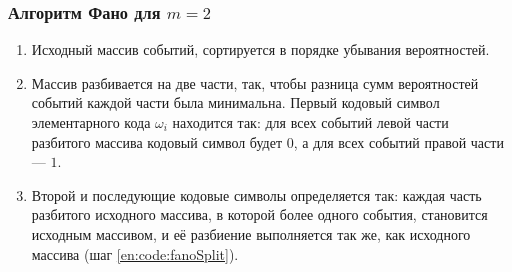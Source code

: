 \begin{frame}
    \frametitle{Алгоритм Фано для $m=2$}
    
    \begin{enumerate}
        \item Исходный массив событий, сортируется в порядке убывания вероятностей. 
    
        \item \label{en:code:fanoSplit} Массив разбивается на две части, так, чтобы разница сумм вероятностей событий каждой части была минимальна. Первый кодовый символ элементарного кода $\omega_i$ находится так: для всех событий левой части разбитого массива кодовый символ будет $0$, а для всех событий правой части --- $1$. 
    
        \item Второй и последующие кодовые символы определяется так: каждая часть разбитого исходного массива, в которой более одного события, становится исходным массивом, и её разбиение выполняется так же, как исходного массива (шаг \ref{en:code:fanoSplit}).
    \end{enumerate}
\end{frame}

